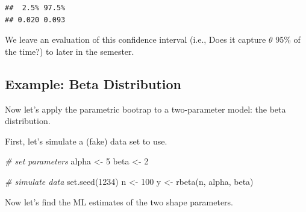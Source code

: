 \documentclass[
]{book}
\newenvironment{Shaded}{\begin{snugshade}}{\end{snugshade}}
\newcommand{\AttributeTok}[1]{\textcolor[rgb]{0.77,0.63,0.00}{#1}}
\newcommand{\CommentTok}[1]{\textcolor[rgb]{0.56,0.35,0.01}{\textit{#1}}}
\newcommand{\ConstantTok}[1]{\textcolor[rgb]{0.00,0.00,0.00}{#1}}
\newcommand{\ControlFlowTok}[1]{\textcolor[rgb]{0.13,0.29,0.53}{\textbf{#1}}}
\newcommand{\DecValTok}[1]{\textcolor[rgb]{0.00,0.00,0.81}{#1}}
\newcommand{\FunctionTok}[1]{\textcolor[rgb]{0.00,0.00,0.00}{#1}}
\newcommand{\NormalTok}[1]{#1}
\newcommand{\OtherTok}[1]{\textcolor[rgb]{0.56,0.35,0.01}{#1}}
\newcommand{\SpecialCharTok}[1]{\textcolor[rgb]{0.00,0.00,0.00}{#1}}
\begin{document}
\begin{verbatim}
##  2.5% 97.5% 
## 0.020 0.093
\end{verbatim}

We leave an evaluation of this confidence interval (i.e., Does it
capture \(\theta\) 95\% of the time?) to later in the semester.

\hypertarget{example-beta-distribution-1}{%
\subsection{Example: Beta
Distribution}\label{example-beta-distribution-1}}

Now let's apply the parametric bootrap to a two-parameter model: the
beta distribution.

First, let's simulate a (fake) data set to use.

\begin{Shaded}
\begin{Highlighting}[]
\CommentTok{\# set parameters}
\NormalTok{alpha }\OtherTok{\textless{}{-}} \DecValTok{5}
\NormalTok{beta }\OtherTok{\textless{}{-}} \DecValTok{2}

\CommentTok{\# simulate data}
\FunctionTok{set.seed}\NormalTok{(}\DecValTok{1234}\NormalTok{)}
\NormalTok{n }\OtherTok{\textless{}{-}} \DecValTok{100}
\NormalTok{y }\OtherTok{\textless{}{-}} \FunctionTok{rbeta}\NormalTok{(n, alpha, beta)}
\end{Highlighting}
\end{Shaded}

Now let's find the ML estimates of the two shape parameters.

\begin{Shaded}
\end{Shaded}
\end{document}
